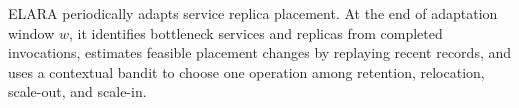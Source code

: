 \documentclass[10pt, conference, letterpaper]{IEEEtran}
\begin{document}

ELARA periodically adapts service replica placement. At the end of adaptation window $w$, it identifies bottleneck services and replicas from completed invocations, estimates feasible placement changes by replaying recent records, and uses a contextual bandit to choose one operation among retention, relocation, scale-out, and scale-in.
\end{document}
